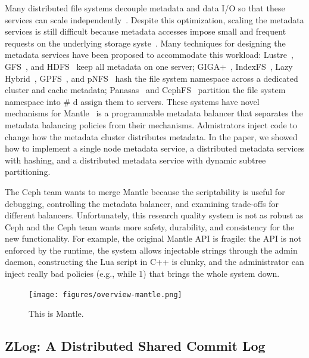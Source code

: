 \documentclass[10pt,twocolumn]{article}
\begin{document}
Many distributed file systems decouple metadata and data I/O so that
these services can scale independently~\cite{alam:pdsw2011-metadata-scaling,ghemawat:sosp2003-gfs,hildebrand:msst2005-pnfs,weil_ceph_2006,welch:fast2008-panasas,shvachko:login2012-hdfs-scalability}. Despite
this optimization, scaling the metadata services is still difficult
because metadata accesses impose small and frequent requests on the
underlying storage syste~\cite{roselli:atec2000-FS-workloads}. Many
techniques for designing the metadata services have been proposed to
accommodate this workload: Lustre~\cite{konstantinos:pdsw2014-lustre-metadata}, GFS~\cite{ghemawat:sosp2003-gfs}, and HDFS~\cite{shvachko:login2012-hdfs-scalability} keep all metadata on one
server; GIGA+~\cite{patil:fast2011-giga}, IndexFS~\cite{ren:sc2014-indexfs}, Lazy Hybrid~\cite{brandt:msst2003-lh}, GPFS~\cite{schmuck:fast2002-gpfs},
and pNFS~\cite{hildebrand:supercomputing2006-pNFS} hash the file
system namespace across a dedicated cluster and cache metadata; Panasas~\cite{welch:fast2008-panasas} and CephFS~\cite{weil:sc2004-dyn-metadata} partition the file system namespace
into \# d assign them to servers. These systems have novel mechanisms
for Mantle~\cite{sevilla:sc15-mantle} is a programmable metadata
balancer that separates the metadata balancing policies from their
mechanisms. Admistrators inject code to change how the metadata cluster
distributes metadata. In the paper, we showed how to implement a single
node metadata service, a distributed metadata services with hashing, and
a distributed metadata service with dynamic subtree partitioning.

The Ceph team wants to merge Mantle because the scriptability is useful
for debugging, controlling the metadata balancer, and examining
trade-offs for different balancers. Unfortunately, this research quality
system is not as robust as Ceph and the Ceph team wants more safety,
durability, and consistency for the new functionality. For example, the
original Mantle API is fragile: the API is not enforced by the runtime,
the system allows injectable strings through the admin daemon,
constructing the Lua script in C++ is clunky, and the administrator can
inject really bad policies (e.g., while 1) that brings the whole system
down.

\begin{figure}[htbp]
\centering
\texttt{[image: figures/overview-mantle.png]}
\caption{This is Mantle.}
\end{figure}

\subsection{ZLog: A Distributed Shared Commit
Log}\label{zlog-a-distributed-shared-commit-log}
\end{document}
